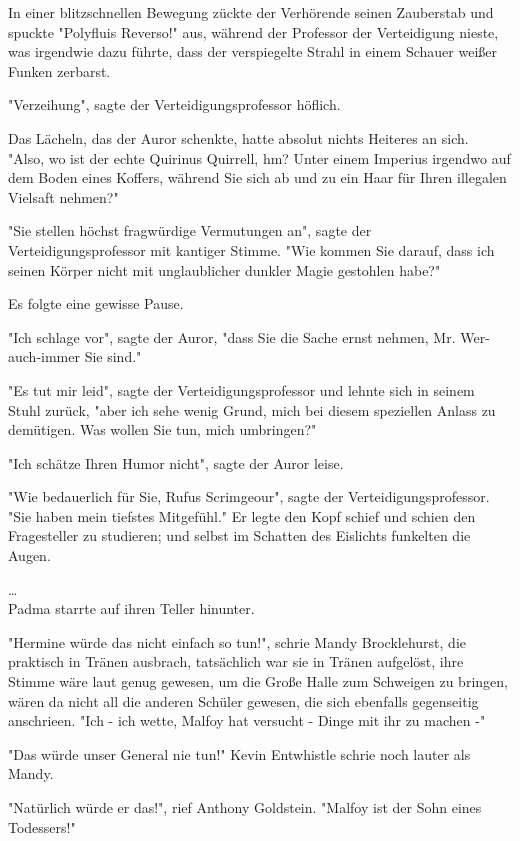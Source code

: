 {In einer blitzschnellen Bewegung zückte der Verhörende seinen Zauberstab und spuckte "Polyfluis Reverso!" aus, während der Professor der Verteidigung nieste, was irgendwie dazu führte, dass der verspiegelte Strahl in einem Schauer weißer Funken zerbarst.

"Verzeihung", sagte der Verteidigungsprofessor höflich.

Das Lächeln, das der Auror schenkte, hatte absolut nichts Heiteres an sich.\\ "Also, wo ist der echte Quirinus Quirrell, hm? Unter einem Imperius irgendwo auf dem Boden eines Koffers, während Sie sich ab und zu ein Haar für Ihren illegalen Vielsaft nehmen?"

"Sie stellen höchst fragwürdige Vermutungen an", sagte der Verteidigungsprofessor mit kantiger Stimme. "Wie kommen Sie darauf, dass ich seinen Körper nicht mit unglaublicher dunkler Magie gestohlen habe?"

Es folgte eine gewisse Pause.

"Ich schlage vor", sagte der Auror, "dass Sie die Sache ernst nehmen, Mr. Wer-auch-immer Sie sind."

"Es tut mir leid", sagte der Verteidigungsprofessor und lehnte sich in seinem Stuhl zurück, "aber ich sehe wenig Grund, mich bei diesem speziellen Anlass zu demütigen. Was wollen Sie tun, mich umbringen?"

"Ich schätze Ihren Humor nicht", sagte der Auror leise.

"Wie bedauerlich für Sie, Rufus Scrimgeour", sagte der Verteidigungsprofessor. "Sie haben mein tiefstes Mitgefühl." Er legte den Kopf schief und schien den Fragesteller zu studieren; und selbst im Schatten des Eislichts funkelten die Augen.

…\\ Padma starrte auf ihren Teller hinunter.

"Hermine würde das nicht einfach so tun!", schrie Mandy Brocklehurst, die praktisch in Tränen ausbrach, tatsächlich war sie in Tränen aufgelöst, ihre Stimme wäre laut genug gewesen, um die Große Halle zum Schweigen zu bringen, wären da nicht all die anderen Schüler gewesen, die sich ebenfalls gegenseitig anschrieen. "Ich - ich wette, Malfoy hat versucht - Dinge mit ihr zu machen -"

"Das würde unser General nie tun!" Kevin Entwhistle schrie noch lauter als Mandy.

"Natürlich würde er das!", rief Anthony Goldstein. "Malfoy ist der Sohn eines Todessers!"

}
